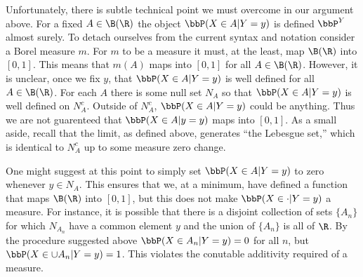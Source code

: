 \documentclass{report}
\begin{document}
\begin{comment}
However, with both the limiting definition and the Radon-Nikodym derivative we need to make sure that we can recover the joint distribution of $X$ and $Y$ from our conditional distribution.
In particular, we need to show that
\[
\bbP(X \in A, Y \in B) = \int_B \bbP(X \in A | Y = y) \bbP^Y(dy).
\]
Here $\bbP^Y(dy)$ denotes integrating with respect to the distribution of $Y$.  We choose to approach this problem from the perspective of the Radon-Nikodym derivative.

This is a rather delicate point though.  The conditional expectation is defined $\bbP^Y$ almost surely.  When $Y$ is a continuous random variable there could be ``lots'' of points for which $\bbP(X \in A | Y = y)$ is undefined.
\end{comment}

Unfortunately, there is subtle technical point we must overcome in our argument above.  For a fixed $A \in \B(\R)$ the object $\bbP(X \in A | Y = y)$ is defined $\bbP^Y$ almost surely.  To detach ourselves from the current syntax and notation consider a Borel measure $m$.  For $m$ to be a measure it must, at the least, map $\B(\R)$ into $[0,1]$.  This means that $m(A)$ maps into $[0,1]$ for all $A \in \B(\R)$.  However, it is unclear, once we fix $y$, that $\bbP(X \in A | Y = y)$ is well defined for all $A \in \B(\R)$.  For each $A$ there is some null set $N_A$ so that $\bbP(X \in A | Y = y)$ is well defined on $N_A^c$.  Outside of $N_A^c$, $\bbP(X \in A | Y = y)$ could be anything.  Thus we are not guarenteed that $\bbP(X \in A | y = y)$ maps into $[0,1]$.  As a small aside, recall that the limit, as defined above, generates ``the Lebesgue set,'' which is identical to $N_A^c$ up to some measure zero change.

One might suggest at this point to simply set $\bbP(X \in A | Y = y)$ to zero whenever $y \in N_A$.  This ensures that we, at a minimum, have defined a function that maps $\B(\R)$ into $[0,1]$, but this does not make $\bbP(X \in \cdot | Y = y)$ a measure.  For instance, it is possible that there is a disjoint collection of sets $\{A_n\}$ for which $N_{A_n}$ have a common element $y$ and the union of $\{A_n\}$ is all of $\R$.  By the procedure suggested above $\bbP(X \in A_n | Y = y) = 0$ for all $n$, but $\bbP(X \in \cup A_n | Y = y) = 1$.  This violates the conutable additivity required of a measure.
\end{document}
